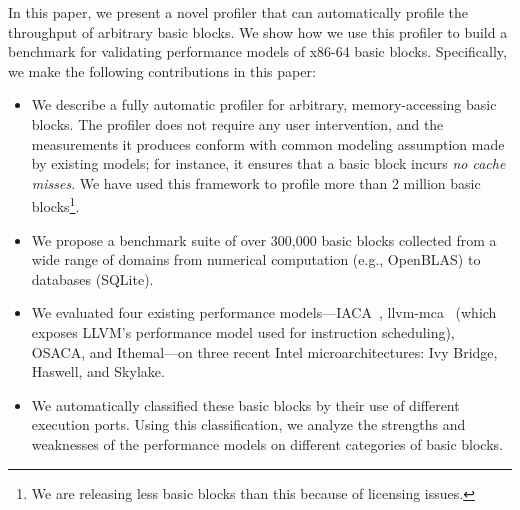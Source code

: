 In this paper, we present a novel profiler that can automatically
profile the throughput of arbitrary basic blocks.
We show how we use this profiler to build a benchmark for validating
performance models of x86-64 basic blocks.
Specifically, we make the following contributions in this paper:
\begin{itemize}
    \item We describe a fully automatic profiler
    for arbitrary, memory-accessing basic blocks.
    The profiler does not require any user intervention, 
    and the measurements it produces conform with common
    modeling assumption made by existing models;
    for instance, it ensures that a basic block incurs
    \textit{no cache misses}.
    We have used this framework to profile more than 2 million basic blocks\footnote{
    We are releasing less basic blocks than this because of licensing issues.
    }.
    
    \item We propose a benchmark suite of over 300,000 basic blocks collected from a wide range of domains from numerical computation (e.g., OpenBLAS) to databases (SQLite).
    
    \item We evaluated four existing performance models---IACA~\cite{iaca}, llvm-mca~\cite{llvm-mca} (which exposes LLVM’s performance model used for instruction scheduling), OSACA\cite{osaca}, and Ithemal\cite{ithemal}---on three recent Intel microarchitectures:
    Ivy Bridge, Haswell, and Skylake.

    \item We automatically classified these basic blocks
    by their use of different execution ports.
    Using this classification,
    we analyze the strengths and weaknesses of 
    the performance models on different categories of basic blocks.
    
\end{itemize}

